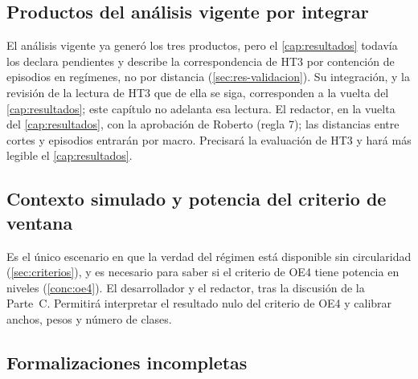 \subsection{Productos del análisis vigente por integrar}
\label{sec:pend-productos}

{El análisis vigente ya generó los tres productos, pero el \cref{cap:resultados} todavía los
declara pendientes y describe la correspondencia de HT3 por contención de episodios en regímenes,
no por distancia (\cref{sec:res-validacion}). Su integración, y la revisión de la lectura de HT3
que de ella se siga, corresponden a la vuelta del \cref{cap:resultados}; este capítulo no
adelanta esa lectura.}
{El redactor, en la vuelta del \cref{cap:resultados}, con la aprobación de Roberto (regla 7); las
distancias entre cortes y episodios entrarán por macro.}
{Precisará la evaluación de HT3 y hará más legible el \cref{cap:resultados}.}

\subsection{Contexto simulado y potencia del criterio de ventana}
\label{sec:pend-simulado}

{Es el único escenario en que la verdad del régimen está disponible sin circularidad
(\cref{sec:criterios}), y es necesario para saber si el criterio de OE4 tiene potencia en niveles
(\ref{conc:oe4}).}
{El desarrollador y el redactor, tras la discusión de la Parte~C.}
{Permitirá interpretar el resultado nulo del criterio de OE4 y calibrar anchos, pesos y número de
clases.}

\subsection{Formalizaciones incompletas}
\label{sec:pend-formal}


